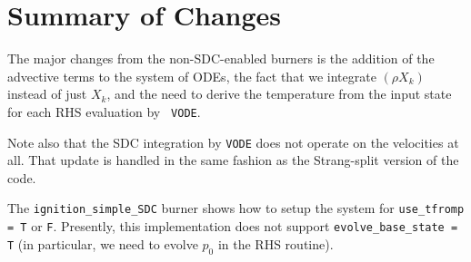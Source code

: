 \section{Summary of Changes}
The major changes from the non-SDC-enabled burners is the addition of
the advective terms to the system of ODEs, the fact that we integrate
$(\rho X_k)$ instead of just $X_k$, and the need to derive the
temperature from the input state for each RHS evaluation by {\tt
  VODE}.

Note also that the SDC integration by {\tt VODE} does not operate on 
the velocities at all.  That update is handled in the same fashion 
as the Strang-split version of the code.

The {\tt ignition\_simple\_SDC} burner shows how to setup the system
for {\tt use\_tfromp = T} or {\tt F}.  Presently, this implementation
does not support {\tt evolve\_base\_state = T} (in particular, we 
need to evolve $p_0$ in the RHS routine).
